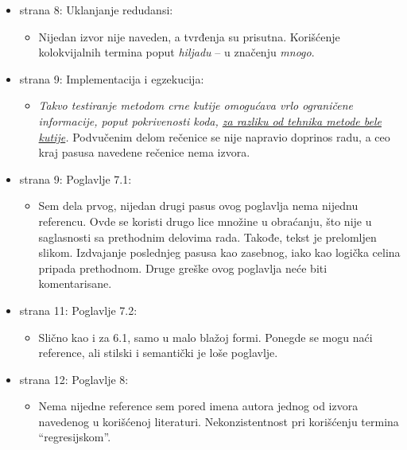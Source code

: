 \documentclass[a4paper]{report}
\begin{document}
\begin{itemize}
\item strana 8: Uklanjanje redudansi:
  \begin{itemize}
  \item Nijedan izvor nije naveden, a tvrđenja su prisutna. Korišćenje kolokvijalnih termina poput {\em{hiljadu}} -- u značenju {\em{mnogo}}.
  \end{itemize}
\end{itemize}

\begin{itemize}
\item strana 9: Implementacija i egzekucija:
  \begin{itemize}
  \item {\em{Takvo testiranje metodom crne kutije omogućava vrlo
      ograničene informacije, poput pokrivenosti koda, {\underline{za razliku od tehnika metode bele kutije}}.}} Podvučenim delom rečenice se nije napravio doprinos radu, a ceo kraj pasusa navedene rečenice nema izvora.
  \end{itemize}
\end{itemize}


\begin{itemize}
\item strana 9: Poglavlje 7.1:
  \begin{itemize}
  \item Sem dela prvog, nijedan drugi pasus ovog poglavlja nema nijednu referencu. Ovde se koristi drugo lice množine u obraćanju, što nije u saglasnosti sa prethodnim delovima rada. Takođe, tekst je prelomljen slikom. Izdvajanje poslednjeg pasusa kao zasebnog, iako kao logička celina pripada prethodnom. Druge greške ovog poglavlja neće biti komentarisane.
  \end{itemize}
\end{itemize}


\begin{itemize}
\item strana 11: Poglavlje 7.2:
  \begin{itemize}
  \item Slično kao i za 6.1, samo u malo blažoj formi. Ponegde se mogu naći reference, ali stilski i semantički je loše poglavlje.
  \end{itemize}
\end{itemize}

\begin{itemize}
\item strana 12: Poglavlje 8:
  \begin{itemize}
  \item Nema nijedne reference sem pored imena autora jednog od izvora navedenog u korišćenoj literaturi. Nekonzistentnost pri korišćenju termina ``regresijskom''.
  \end{itemize}
\end{itemize}
\end{document}
